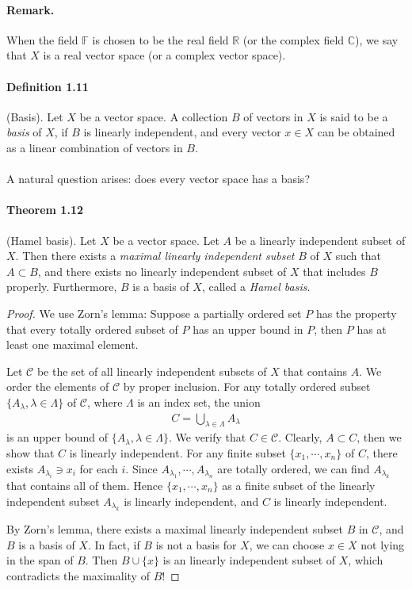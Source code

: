 \documentclass{article}
\begin{document}
\paragraph{Remark.} When the field $\mathbb{F}$ is chosen to be the real field $\mathbb{R}$ (or the complex field $\mathbb{C}$), we say that $X$ is a real vector space (or a complex vector space).

\paragraph{Definition 1.11\label{def:1.11}} (Basis). Let $X$ be a vector space. A collection $B$ of vectors in $X$ is said to be a \textit{basis} of $X$, if $B$ is linearly independent, and every vector $x\in X$ can be obtained as a linear combination of vectors in $B$. 

\paragraph{} A natural question arises: does every vector space has a basis?

\paragraph{Theorem 1.12\label{thm:1.12}} (Hamel basis). Let $X$ be a vector space. Let $A$ be a linearly independent subset of $X$. Then there exists a \textit{maximal linearly independent subset} $B$ of $X$ such that $A\subset B$, and there exists no linearly independent subset of $X$ that includes $B$ properly. Furthermore, $B$ is a basis of $X$, called a \textit{Hamel basis}.
\begin{proof}
We use Zorn's lemma: Suppose a partially ordered set $P$ has the property that every totally ordered subset of $P$ has an upper bound in $P$, then $P$ has at least one maximal element.

Let $\mathscr{C}$ be the set of all linearly independent subsets of $X$ that contains $A$. We order the elements of $\mathscr{C}$ by proper inclusion. For any totally ordered subset $\{A_\lambda,\lambda\in\Lambda\}$ of $\mathscr{C}$, where $\Lambda$ is an index set, the union
\begin{align*}
	C=\bigcup_{\lambda\in\Lambda} A_\lambda
\end{align*}
is an upper bound of $\{A_\lambda,\lambda\in\Lambda\}$. We verify that $C\in\mathscr{C}$. Clearly, $A\subset C$, then we show that $C$ is linearly independent. For any finite subset $\{x_1,\cdots,x_n\}$ of $C$, there exists $A_{\lambda_i}\ni x_i$ for each $i$. Since $A_{\lambda_1},\cdots,A_{\lambda_n}$ are totally ordered, we can find $A_{\lambda_k}$ that contains all of them. Hence $\{x_1,\cdots,x_n\}$ as a finite subset of the linearly independent subset $A_{\lambda_k}$ is linearly independent, and $C$ is linearly independent.

By Zorn's lemma, there exists a maximal linearly independent subset $B$ in $\mathscr{C}$, and $B$ is a basis of $X$. In fact, if $B$ is not a basis for $X$, we can choose $x\in X$ not lying in the span of $B$. Then $B\cup\{x\}$ is an linearly independent subset of $X$, which contradicts the maximality of $B$!
\end{proof}
\end{document}
